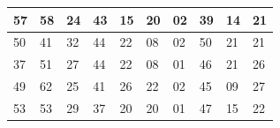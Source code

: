 \documentclass[a4paper]{scrartcl}
\begin{document}
\begin{table}[htb]
\begin{adjustwidth}{-2cm}{-2cm}
\begin{tabular}{| l | l | l | l | l | l | l | l | l | l |}
			\hline
			57 & 58 & 24 & 43 & 15 & 20 & 02 & 39 & 14 & 21 \\
			\hline
			50 & 41 & 32 & 44 & 22 & 08 & 02 & 50 & 21 & 21 \\
			\hline
			37 & 51 & 27 & 44 & 22 & 08 & 01 & 46 & 21 & 26 \\
			\hline
			49 & 62 & 25 & 41 & 26 & 22 & 02 & 45 & 09 & 27 \\
			\hline
			53 & 53 & 29 & 37 & 20 & 20 & 01 & 47 & 15 & 22 \\ 
			\hline
		\end{tabular}
	\end{adjustwidth}
\end{table} 
\end{document}
